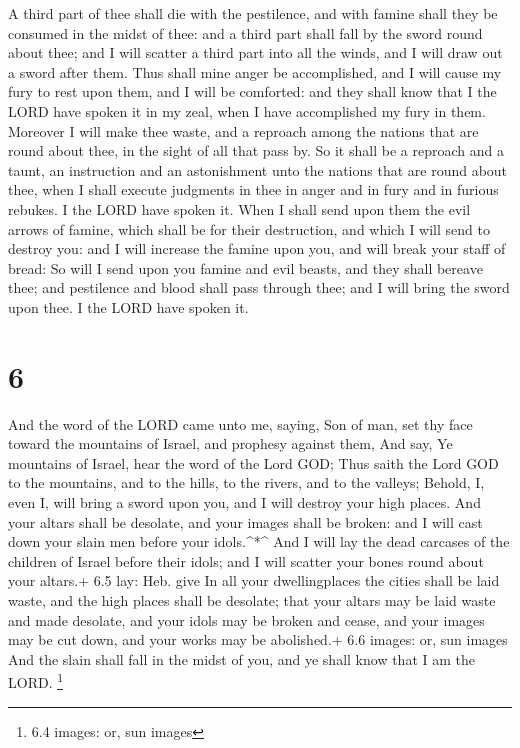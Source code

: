  A third part of thee shall die with the pestilence, and
with famine shall they be consumed in the midst of thee: and a third
part shall fall by the sword round about thee; and I will scatter a
third part into all the winds, and I will draw out a sword after them.
 Thus shall mine anger be accomplished, and I will cause my
fury to rest upon them, and I will be comforted: and they shall know
that I the LORD have spoken it in my zeal, when I have accomplished my
fury in them.  Moreover I will make thee waste, and a
reproach among the nations that are round about thee, in the sight of
all that pass by.  So it shall be a reproach and a taunt,
an instruction and an astonishment unto the nations that are round about
thee, when I shall execute judgments in thee in anger and in fury and in
furious rebukes. I the LORD have spoken it.  When I shall
send upon them the evil arrows of famine, which shall be for their
destruction, and which I will send to destroy you: and I will increase
the famine upon you, and will break your staff of bread: 
So will I send upon you famine and evil beasts, and they shall bereave
thee; and pestilence and blood shall pass through thee; and I will bring
the sword upon thee. I the LORD have spoken it.

\hypertarget{section-5}{%
\section{6}\label{section-5}}

 And the word of the LORD came unto me, saying, 
Son of man, set thy face toward the mountains of Israel, and prophesy
against them,  And say, Ye mountains of Israel, hear the
word of the Lord GOD; Thus saith the Lord GOD to the mountains, and to
the hills, to the rivers, and to the valleys; Behold, I, even I, will
bring a sword upon you, and I will destroy your high places.
 And your altars shall be desolate, and your images shall be
broken: and I will cast down your slain men before your idols.\^{}*\^{}
 And I will lay the dead carcases of the children of Israel
before their idols; and I will scatter your bones round about your
altars.+ 6.5 lay: Heb. give  In all your dwellingplaces the
cities shall be laid waste, and the high places shall be desolate; that
your altars may be laid waste and made desolate, and your idols may be
broken and cease, and your images may be cut down, and your works may be
abolished.+ 6.6 images: or, sun images  And the slain shall
fall in the midst of you, and ye shall know that I am the LORD.
\footnote{6.4 images: or, sun images}

